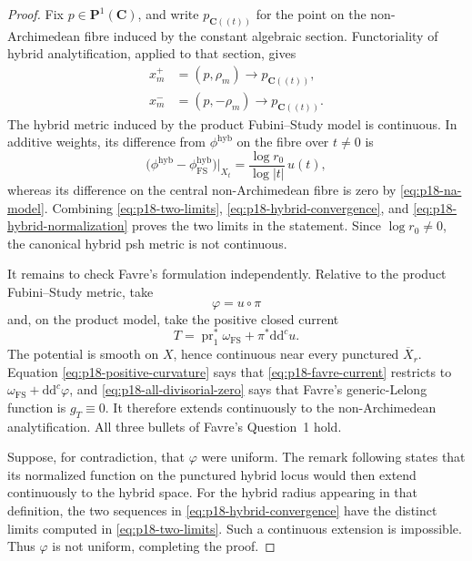 \begin{proof}
Fix \(p\in\mathbf P^1(\mathbf C)\), and write \(p_{\mathbf C((t))}\)
for the point on the non-Archimedean fibre induced by the constant
algebraic section.  Functoriality of hybrid analytification, applied to
that section, gives
\[
\begin{aligned}
 x_m^+&=(p,\rho_m)\longrightarrow p_{\mathbf C((t))},\\
 x_m^-&=(p,-\rho_m)\longrightarrow p_{\mathbf C((t))}.
\end{aligned}
\tag{66.20r}\label{eq:p18-hybrid-convergence}
\]
The hybrid metric induced by the product Fubini--Study model is
continuous.  In additive weights, its difference from
\(\phi^{\mathrm{hyb}}\) on the fibre over \(t\ne0\) is
\[
 \bigl(\phi^{\mathrm{hyb}}
       -\phi_{\mathrm{FS}}^{\mathrm{hyb}}\bigr)|_{X_t}
 =\frac{\log r_0}{\log|t|}\,u(t),
\tag{66.20s}\label{eq:p18-hybrid-normalization}
\]
whereas its difference on the central non-Archimedean fibre is zero by
\eqref{eq:p18-na-model}.  Combining
\eqref{eq:p18-two-limits},
\eqref{eq:p18-hybrid-convergence}, and
\eqref{eq:p18-hybrid-normalization} proves the two limits in the
statement.  Since \(\log r_0\ne0\), the canonical hybrid psh metric is
not continuous.

It remains to check Favre's formulation independently.  Relative to the
product Fubini--Study metric, take
\[
                         \varphi=u\circ\pi
\]
and, on the product model, take the positive closed current
\[
 T=
 \operatorname{pr}_1^*\omega_{\mathrm{FS}}
 +\pi^*\mathrm d\mathrm d^c u.
\tag{66.20t}\label{eq:p18-favre-current}
\]
The potential is smooth on \(X\), hence continuous near every punctured
\(\overline X_r\).  Equation \eqref{eq:p18-positive-curvature} says that
\eqref{eq:p18-favre-current} restricts to
\(\omega_{\mathrm{FS}}+\mathrm d\mathrm d^c\varphi\), and
\eqref{eq:p18-all-divisorial-zero} says that Favre's generic-Lelong
function is \(g_T\equiv0\).  It therefore extends continuously to the
non-Archimedean analytification.  All three bullets of Favre's
Question~1 hold.

Suppose, for contradiction, that \(\varphi\) were uniform.  The remark
following \cite[Definition~4.1]{Favre20Hybrid} states that its normalized function on
the punctured hybrid locus would then extend continuously to the hybrid
space.  For the hybrid radius appearing in that definition, the two
sequences in \eqref{eq:p18-hybrid-convergence} have the distinct limits
computed in \eqref{eq:p18-two-limits}.  Such a continuous extension is
impossible.  Thus \(\varphi\) is not uniform, completing the proof.
\end{proof}
